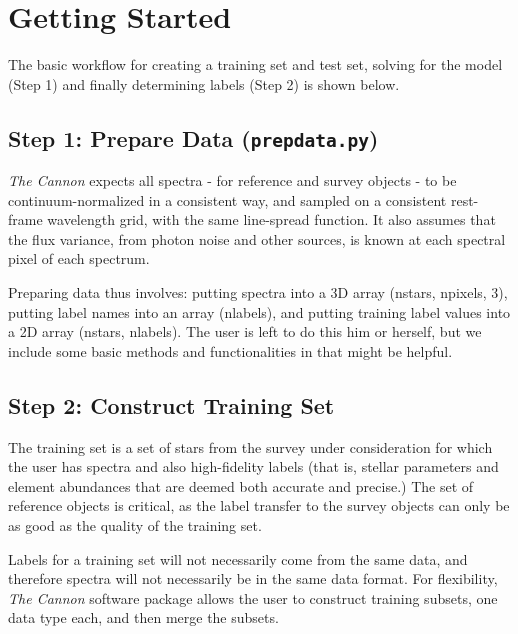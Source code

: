 \documentclass[letterpaper,10pt,english]{sphinxmanual}
\begin{document}
\chapter{Getting Started}
\label{index:getting-started}
The basic workflow for creating a training set and test set, solving for
the model (Step 1) and finally determining labels (Step 2) is shown below.


\section{Step 1: Prepare Data (\texttt{prepdata.py})}
\label{index:step-1-prepare-data-prepdata-py}
\emph{The Cannon} expects all spectra - for reference and survey objects -
to be continuum-normalized in a consistent way, and sampled on a consistent
rest-frame wavelength grid, with the same line-spread function. It also
assumes that the flux variance, from photon noise and other sources, is
known at each spectral pixel of each spectrum.

Preparing data thus involves: putting spectra into a 3D array
(nstars, npixels, 3), putting label names into an array (nlabels),
and putting training label values into a 2D array (nstars, nlabels).
The user is left to do this him or herself, but we include some basic
methods and functionalities in  that might be helpful.


\section{Step 2: Construct Training Set}
\label{index:step-2-construct-training-set}
The training set is a set of stars from the survey under consideration
for which the user has spectra and also high-fidelity labels (that is,
stellar parameters and element abundances that are deemed both accurate
and precise.) The set of reference objects is critical, as the label
transfer to the survey objects can only be as good as the quality of the
training set.

Labels for a training set will not necessarily come from the same data,
and therefore spectra will not necessarily be in the same data format.
For flexibility, \emph{The Cannon} software package allows the user to construct
training subsets, one data type each, and then merge the subsets.
\end{document}
